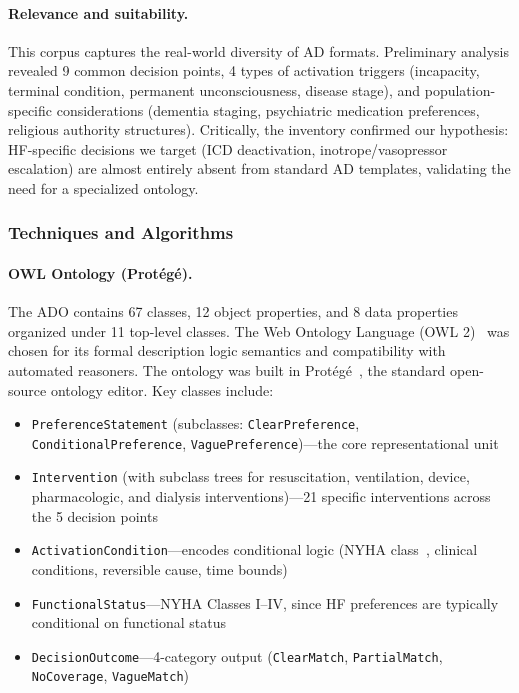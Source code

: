 \documentclass[11pt]{article}
\newcommand{\onto}[1]{\texttt{#1}}
\begin{document}
\paragraph{Relevance and suitability.}
This corpus captures the real-world diversity of AD formats. Preliminary analysis revealed 9 common decision points, 4 types of activation triggers (incapacity, terminal condition, permanent unconsciousness, disease stage), and population-specific considerations (dementia staging, psychiatric medication preferences, religious authority structures). Critically, the inventory confirmed our hypothesis: HF-specific decisions we target (ICD deactivation, inotrope/vasopressor escalation) are almost entirely absent from standard AD templates, validating the need for a specialized ontology.

\subsubsection{Techniques and Algorithms}

\paragraph{OWL Ontology (Prot\'eg\'e).}
The ADO contains 67 classes, 12 object properties, and 8 data properties organized under 11 top-level classes. The Web Ontology Language (OWL 2)~\cite{owl2primer} was chosen for its formal description logic semantics and compatibility with automated reasoners. The ontology was built in Prot\'eg\'e~\cite{protege}, the standard open-source ontology editor. Key classes include:

\begin{itemize}[nosep]
    \item \onto{PreferenceStatement} (subclasses: \onto{ClearPreference}, \onto{ConditionalPreference}, \onto{VaguePreference})---the core representational unit
    \item \onto{Intervention} (with subclass trees for resuscitation, ventilation, device, pharmacologic, and dialysis interventions)---21 specific interventions across the 5 decision points
    \item \onto{ActivationCondition}---encodes conditional logic (NYHA class~\cite{nyha}, clinical conditions, reversible cause, time bounds)
    \item \onto{FunctionalStatus}---NYHA Classes I--IV, since HF preferences are typically conditional on functional status
    \item \onto{DecisionOutcome}---4-category output (\onto{ClearMatch}, \onto{PartialMatch}, \onto{NoCoverage}, \onto{VagueMatch})
\end{itemize}
\end{document}
